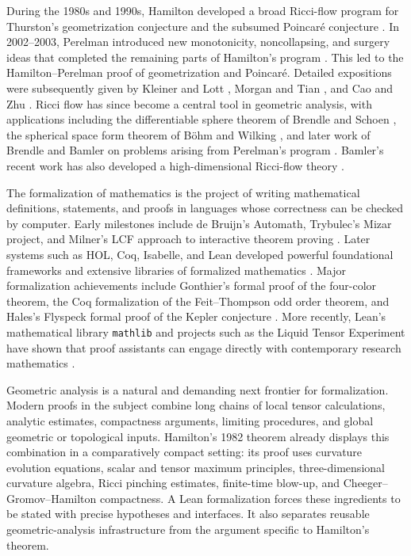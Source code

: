 \documentclass[11pt]{article}
\theoremstyle{plain}
\theoremstyle{definition}
\theoremstyle{remark}
\begin{document}
During the 1980s and 1990s, Hamilton developed a broad Ricci-flow program for
Thurston's geometrization conjecture and the subsumed Poincar\'e conjecture
\cite{Hamilton1995SDG,Ham97,MR1714939,CCCY}.  In 2002--2003, Perelman
introduced new monotonicity, noncollapsing, and surgery ideas that completed
the remaining parts of Hamilton's program \cite{Perelman1,Perelman2,Perelman3}.
This led to the Hamilton--Perelman proof of geometrization and Poincar\'e.
Detailed expositions were subsequently given by Kleiner and Lott
\cite{MR2460872}, Morgan and Tian \cite{MR2334563,MR3186136}, and Cao and Zhu
\cite{MR2233789}.  Ricci flow has since become a central tool in geometric
analysis, with applications including the differentiable sphere theorem of
Brendle and Schoen \cite{BrendleSchoen}, the spherical space form theorem of
B\"ohm and Wilking \cite{BohmWilking}, and later work of Brendle and Bamler on
problems arising from Perelman's program \cite{Brendle2018U,Bamler0}.  Bamler's
recent work has also developed a high-dimensional Ricci-flow theory
\cite{Bamler2020A,MR4623543,Bamler2020C}.

The formalization of mathematics is the project of writing mathematical
definitions, statements, and proofs in languages whose correctness can be
checked by computer.  Early milestones include de Bruijn's Automath,
Trybulec's Mizar project, and Milner's LCF approach to interactive theorem
proving \cite{deBruijnAutomath,TrybulecMizar,GordonMilnerWadsworthLCF}.
Later systems such as HOL, Coq, Isabelle, and Lean developed powerful
foundational frameworks and extensive libraries of formalized mathematics
\cite{GordonHOL,Coq,PaulsonIsabelle,deMouraLean}.  Major formalization
achievements include Gonthier's formal proof of the four-color theorem, the Coq
formalization of the Feit--Thompson odd order theorem, and Hales's Flyspeck
formal proof of the Kepler conjecture
\cite{GonthierFourColor,GonthierOddOrder,HalesFlyspeck}.  More recently,
Lean's mathematical library \texttt{mathlib} and projects such as the Liquid
Tensor Experiment have shown that proof assistants can engage directly with
contemporary research mathematics \cite{mathlib,CommelinLiquidTensor}.

Geometric analysis is a natural and demanding next frontier for formalization.
Modern proofs in the subject combine long chains of local tensor calculations,
analytic estimates, compactness arguments, limiting procedures, and global
geometric or topological inputs.  Hamilton's 1982 theorem already displays this
combination in a comparatively compact setting: its proof uses curvature
evolution equations, scalar and tensor maximum principles, three-dimensional
curvature algebra, Ricci pinching estimates, finite-time blow-up, and
Cheeger--Gromov--Hamilton compactness.  A Lean formalization forces these
ingredients to be stated with precise hypotheses and interfaces.  It also
separates reusable geometric-analysis infrastructure from the argument specific
to Hamilton's theorem.
\end{document}
